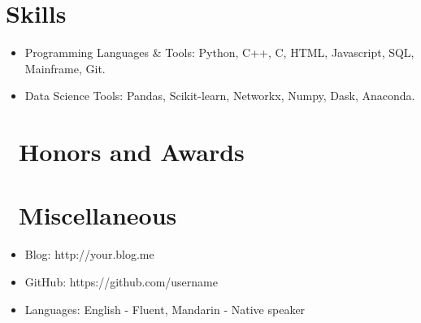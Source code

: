 \documentclass{resume}
\begin{document}
\section{Skills}
\begin{itemize}[parsep=0.5ex]
  \item Programming Languages \& Tools: Python, C++, C, HTML, Javascript, SQL, Mainframe, Git.
  \item Data Science Tools: Pandas, Scikit-learn, Networkx, Numpy, Dask, Anaconda.
\end{itemize}



\section{\faHeartO\ Honors and Awards}

\section{\faInfo\ Miscellaneous}
\begin{itemize}[parsep=0.5ex]
  \item Blog: http://your.blog.me
  \item GitHub: https://github.com/username
  \item Languages: English - Fluent, Mandarin - Native speaker
\end{itemize}

%
%
\end{document}
